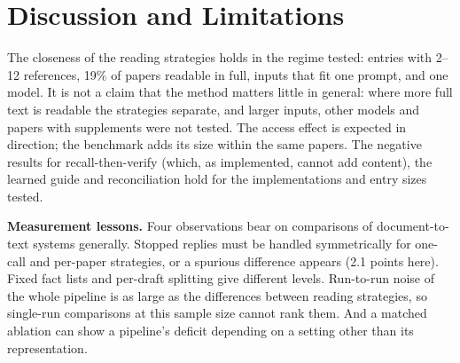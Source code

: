 \documentclass{article} %
\begin{document}
\section{Discussion and Limitations}
\label{sec:discussion}
The closeness of the reading strategies holds in the regime tested: entries with 2--12 references, 19\% of papers readable in full, inputs that fit one prompt, and one model. It is not a claim that the method matters little in general: where more full text is readable the strategies separate, and larger inputs, other models and papers with supplements were not tested. The access effect is expected in direction; the benchmark adds its size within the same papers. The negative results for recall-then-verify (which, as implemented, cannot add content), the learned guide and reconciliation hold for the implementations and entry sizes tested.

\textbf{Measurement lessons.} Four observations bear on comparisons of document-to-text systems generally. Stopped replies must be handled symmetrically for one-call and per-paper strategies, or a spurious difference appears (2.1 points here). Fixed fact lists and per-draft splitting give different levels. Run-to-run noise of the whole pipeline is as large as the differences between reading strategies, so single-run comparisons at this sample size cannot rank them. And a matched ablation can show a pipeline's deficit depending on a setting other than its representation.
\end{document}
